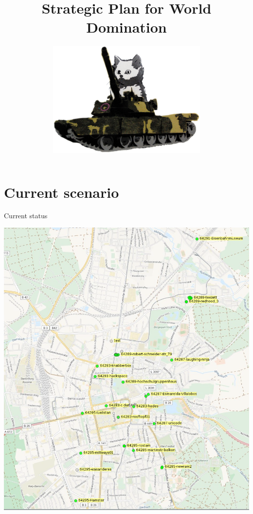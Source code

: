 \documentclass{beamer}
\title{Strategic Plan for World Domination}
\author{\includegraphics[width=8cm]{Cat_in_Tank}} %
\date{}
\begin{document}
\begin{frame}
\maketitle
\end{frame}



\section{Current scenario}
\begin{frame}{Current status}
\vfill
\begin{center}
\includegraphics[height=0.8\textheight]{darmstadt-map}
\end{center}
\end{frame}
\end{document}
